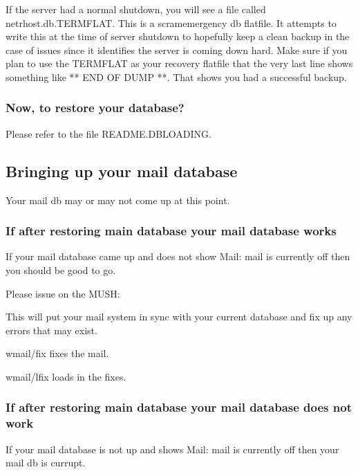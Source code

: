 \documentclass[letterpaper,10pt,english]{sphinxmanual}
\begin{document}
\sphinxAtStartPar
If the server had a normal shutdown, you will see a file called
netrhost.db.TERMFLAT.  This is a scram\sphinxhyphen{}emergency db flatfile.
It attempts to write this at the time of server shutdown to
hopefully keep a clean backup in the case of issues since
it identifies the server is coming down hard.  Make sure
if you plan to use the TERMFLAT as your recovery flatfile
that the very last line shows something like ** END OF DUMP **.
That shows you had a successful backup.


\subsubsection{Now, to restore your database?}
\label{\detokenize{troubleshooting:now-to-restore-your-database}}
\sphinxAtStartPar
Please refer to the file \textquotesingle{}README.DBLOADING\textquotesingle{}.


\subsection{Bringing up your mail database}
\label{\detokenize{troubleshooting:bringing-up-your-mail-database}}
\sphinxAtStartPar
Your mail db may or may not come up at this point.


\subsubsection{If after restoring main database your mail database works}
\label{\detokenize{troubleshooting:if-after-restoring-main-database-your-mail-database-works}}
\sphinxAtStartPar
If your mail database came up and does not show
\textquotesingle{}Mail: mail is currently off\textquotesingle{} then you should be good to go.

\sphinxAtStartPar
Please issue on the MUSH:

\begin{sphinxVerbatim}[commandchars=\\\{\}]
\end{sphinxVerbatim}

\sphinxAtStartPar
This will put your mail system in sync with your current database and
fix up any errors that may exist.

\sphinxAtStartPar
wmail/fix fixes the mail.

\sphinxAtStartPar
wmail/lfix loads in the fixes.


\subsubsection{If after restoring main database your mail database does not work}
\label{\detokenize{troubleshooting:if-after-restoring-main-database-your-mail-database-does-not-work}}
\sphinxAtStartPar
If your mail database is not up and shows \textquotesingle{}Mail: mail is currently off\textquotesingle{} then your mail db is currupt.
\end{document}
